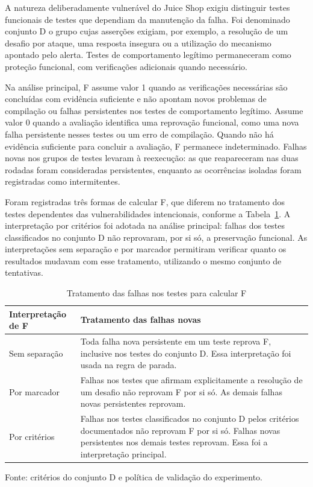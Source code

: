 A natureza deliberadamente vulnerável do Juice Shop exigiu distinguir testes funcionais de testes que dependiam da manutenção da falha. Foi denominado conjunto D o grupo cujas asserções exigiam, por exemplo, a resolução de um desafio por ataque, uma resposta insegura ou a utilização do mecanismo apontado pelo alerta. Testes de comportamento legítimo permaneceram como proteção funcional, com verificações adicionais quando necessário.

Na análise principal, F assume valor 1 quando as verificações necessárias são concluídas com evidência suficiente e não apontam novos problemas de compilação ou falhas persistentes nos testes de comportamento legítimo. Assume valor 0 quando a avaliação identifica uma reprovação funcional, como uma nova falha persistente nesses testes ou um erro de compilação. Quando não há evidência suficiente para concluir a avaliação, F permanece indeterminado. Falhas novas nos grupos de testes levaram à reexecução: as que reapareceram nas duas rodadas foram consideradas persistentes, enquanto as ocorrências isoladas foram registradas como intermitentes.

Foram registradas três formas de calcular F, que diferem no tratamento dos testes dependentes das vulnerabilidades intencionais, conforme a Tabela~\ref{tab:interpretacoes-f}. A interpretação por critérios foi adotada na análise principal: falhas dos testes classificados no conjunto D não reprovaram, por si só, a preservação funcional. As interpretações sem separação e por marcador permitiram verificar quanto os resultados mudavam com esse tratamento, utilizando o mesmo conjunto de tentativas.

\begin{table}[H]
\centering
\caption{Tratamento das falhas nos testes para calcular F}
\label{tab:interpretacoes-f}
\renewcommand{\arraystretch}{1.35}
\begin{tabularx}{\textwidth}{|>{\raggedright\arraybackslash}p{}|>{\raggedright\arraybackslash}X|}
\hline
\textbf{Interpretação de F} & \textbf{Tratamento das falhas novas} \\
\hline
Sem separação & Toda falha nova persistente em um teste reprova F, inclusive nos testes do conjunto D. Essa interpretação foi usada na regra de parada. \\
\hline
Por marcador & Falhas nos testes que afirmam explicitamente a resolução de um desafio não reprovam F por si só. As demais falhas novas persistentes reprovam. \\
\hline
Por critérios & Falhas nos testes classificados no conjunto D pelos critérios documentados não reprovam F por si só. Falhas novas persistentes nos demais testes reprovam. Essa foi a interpretação principal. \\
\hline
\end{tabularx}

\vspace{0.2cm}
\begin{minipage}{\textwidth}
    \footnotesize
    Fonte: critérios do conjunto D e política de validação do experimento.
\end{minipage}
\end{table}

